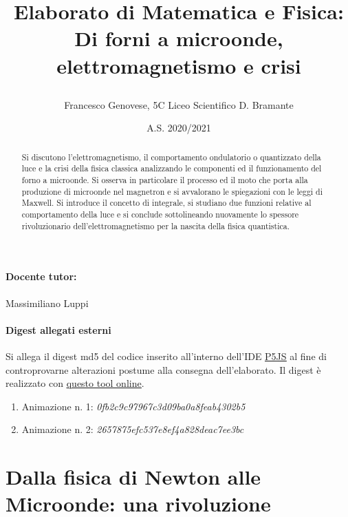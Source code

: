 \documentclass{article}
\title{
Elaborato di Matematica e Fisica:\\
Di forni a microonde, elettromagnetismo e crisi 
\vspace{1mm} %

}
\author{Francesco Genovese, 5C Liceo Scientifico D. Bramante}
\date{A.S. 2020/2021}
\begin{document}
\maketitle
\vspace*{-0.2in}
\begin{abstract}
Si discutono  l'elettromagnetismo, il comportamento ondulatorio o quantizzato della luce e la crisi della fisica classica analizzando le componenti ed il funzionamento del forno a microonde. Si osserva in particolare il processo ed il moto che porta alla produzione di microonde nel magnetron e si avvalorano le spiegazioni con le leggi di Maxwell. Si introduce il concetto di integrale,  si studiano due funzioni relative al comportamento della luce e si conclude sottolineando nuovamente lo spessore rivoluzionario dell'elettromagnetismo per la nascita della fisica quantistica. 
\end{abstract}

\tableofcontents

\paragraph{Docente tutor:} Massimiliano Luppi
\paragraph{Digest allegati esterni}
Si allega il digest md5 del codice inserito all'interno dell'IDE \href{https://editor.p5js.org/}{\underline{P5JS}} al fine di controprovarne alterazioni postume alla consegna dell'elaborato. Il digest è realizzato con \href{https://emn178.github.io/online-tools/md5.html}{\underline{questo tool online}}.
\begin{enumerate}[noitemsep]
\item Animazione n. 1: \textit{0fb2c9c97967c3d09ba0a8feab4302b5}
\item Animazione n. 2: \textit{2657875efc537e8ef4a828deac7ee3bc}

\end{enumerate}
\newpage

\section{Dalla fisica di Newton alle Microonde: una rivoluzione}
\end{document}
